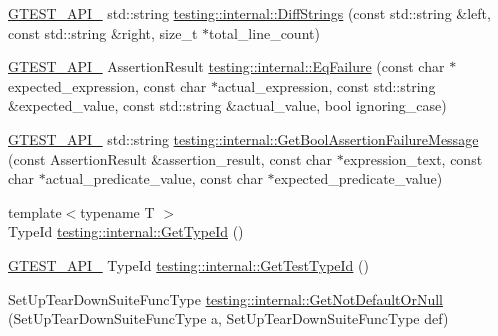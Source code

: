 \begin{DoxyCompactItemize}
\item 
\mbox{\hyperlink{_obj__test_2lib_2googletest-release-1_88_81_2googletest_2include_2gtest_2internal_2gtest-port_8h_aa73be6f0ba4a7456180a94904ce17790}{G\+T\+E\+S\+T\+\_\+\+A\+P\+I\+\_\+}} std\+::string \mbox{\hyperlink{namespacetesting_1_1internal_a513107ff8defa97d949937fc1350a56c}{testing\+::internal\+::\+Diff\+Strings}} (const std\+::string \&left, const std\+::string \&right, size\+\_\+t $\ast$total\+\_\+line\+\_\+count)
\item 
\mbox{\hyperlink{_obj__test_2lib_2googletest-release-1_88_81_2googletest_2include_2gtest_2internal_2gtest-port_8h_aa73be6f0ba4a7456180a94904ce17790}{G\+T\+E\+S\+T\+\_\+\+A\+P\+I\+\_\+}} Assertion\+Result \mbox{\hyperlink{namespacetesting_1_1internal_a08725846ff184d3e79bcf5be4df19157}{testing\+::internal\+::\+Eq\+Failure}} (const char $\ast$expected\+\_\+expression, const char $\ast$actual\+\_\+expression, const std\+::string \&expected\+\_\+value, const std\+::string \&actual\+\_\+value, bool ignoring\+\_\+case)
\item 
\mbox{\hyperlink{_obj__test_2lib_2googletest-release-1_88_81_2googletest_2include_2gtest_2internal_2gtest-port_8h_aa73be6f0ba4a7456180a94904ce17790}{G\+T\+E\+S\+T\+\_\+\+A\+P\+I\+\_\+}} std\+::string \mbox{\hyperlink{namespacetesting_1_1internal_a5fd6e5dc9eb20ab3c3a80e24d89dfac6}{testing\+::internal\+::\+Get\+Bool\+Assertion\+Failure\+Message}} (const Assertion\+Result \&assertion\+\_\+result, const char $\ast$expression\+\_\+text, const char $\ast$actual\+\_\+predicate\+\_\+value, const char $\ast$expected\+\_\+predicate\+\_\+value)
\item 
{\footnotesize template$<$typename T $>$ }\\Type\+Id \mbox{\hyperlink{namespacetesting_1_1internal_a6b108e56fdc68ea937ffb3759fb55ab0}{testing\+::internal\+::\+Get\+Type\+Id}} ()
\item 
\mbox{\hyperlink{_obj__test_2lib_2googletest-release-1_88_81_2googletest_2include_2gtest_2internal_2gtest-port_8h_aa73be6f0ba4a7456180a94904ce17790}{G\+T\+E\+S\+T\+\_\+\+A\+P\+I\+\_\+}} Type\+Id \mbox{\hyperlink{namespacetesting_1_1internal_ad0d66d56ead224263cd100c1d6bfc562}{testing\+::internal\+::\+Get\+Test\+Type\+Id}} ()
\item 
Set\+Up\+Tear\+Down\+Suite\+Func\+Type \mbox{\hyperlink{namespacetesting_1_1internal_a9579a78c229ea302caded45d65f77336}{testing\+::internal\+::\+Get\+Not\+Default\+Or\+Null}} (Set\+Up\+Tear\+Down\+Suite\+Func\+Type a, Set\+Up\+Tear\+Down\+Suite\+Func\+Type def)
\item 

\end{DoxyCompactItemize}
